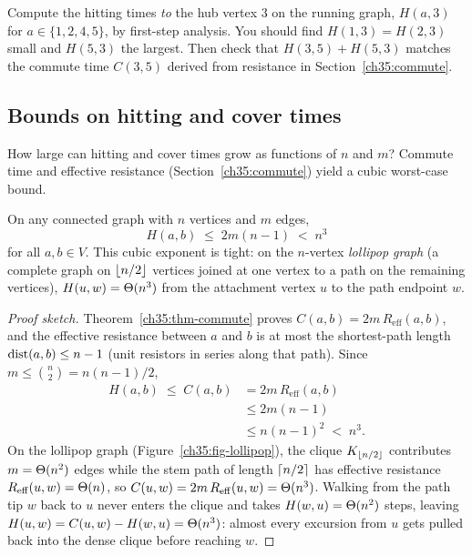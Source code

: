 \begin{labbox}
Compute the hitting times \emph{to} the hub vertex $3$ on the running graph, $H(a,3)$ for $a\in\{1,2,4,5\}$, by first-step analysis. You should find $H(1,3)=H(2,3)$ small and $H(5,3)$ the largest. Then check that $H(3,5)+H(5,3)$ matches the commute time $C(3,5)$ derived from resistance in Section~\ref{ch35:commute}.
\end{labbox}

\subsection{Bounds on hitting and cover times}

How large can hitting and cover times grow as functions of $n$ and $m$? Commute time and effective resistance (Section~\ref{ch35:commute}) yield a cubic worst-case bound.

\begin{theorem}\label{ch35:thm-hitbound}
On any connected graph with $n$ vertices and $m$ edges,
\[
  H(a,b) \;\le\; 2m(n-1) \;<\; n^3
\]
for all $a,b\in V$. This cubic exponent is tight: on the $n$-vertex \emph{lollipop graph} (a complete graph on $\lfloor n/2\rfloor$ vertices joined at one vertex to a path on the remaining vertices), $H(u,w)=\Theta(n^3)$ from the attachment vertex $u$ to the path endpoint $w$.
\end{theorem}

\begin{proof}[Proof sketch]
Theorem~\ref{ch35:thm-commute} proves $C(a,b)=2m\,R_{\mathrm{eff}}(a,b)$, and the effective resistance between $a$ and $b$ is at most the shortest-path length $\operatorname{dist}(a,b) \le n-1$ (unit resistors in series along that path). Since $m \le \binom{n}{2} = n(n-1)/2$,
\begin{align*}
  H(a,b) \;\le\; C(a,b) &= 2m\,R_{\mathrm{eff}}(a,b) \\
  &\le 2m(n-1) \\
  &\le n(n-1)^2 \;<\; n^3.
\end{align*}
On the lollipop graph (Figure~\ref{ch35:fig-lollipop}), the clique $K_{\lfloor n/2\rfloor}$ contributes $m=\Theta(n^2)$ edges while the stem path of length $\lceil n/2\rceil$ has effective resistance $R_{\mathrm{eff}}(u,w)=\Theta(n)$, so $C(u,w)=2m\,R_{\mathrm{eff}}(u,w)=\Theta(n^3)$. Walking from the path tip $w$ back to $u$ never enters the clique and takes $H(w,u)=\Theta(n^2)$ steps, leaving $H(u,w)=C(u,w)-H(w,u)=\Theta(n^3)$: almost every excursion from $u$ gets pulled back into the dense clique before reaching $w$.
\end{proof}

